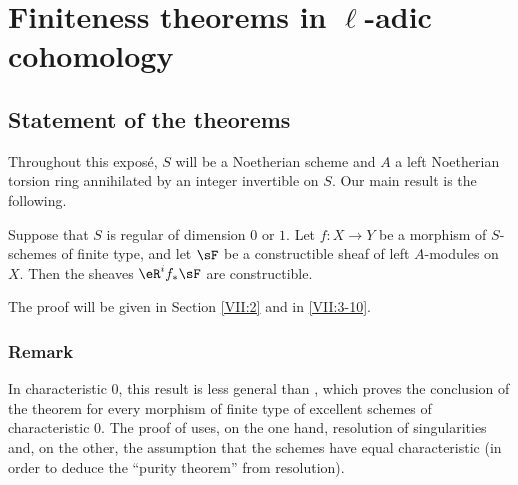 


\chapter{Finiteness theorems in \texorpdfstring{$\ell$}{l}-adic cohomology}\label{VII}











\section{Statement of the theorems}\label{VII:1}

Throughout this exposé, $S$ will be a Noetherian scheme and $A$ a left
Noetherian torsion ring annihilated by an integer invertible on $S$. Our main
result is the following.






\begin{theorem_}\label{VII:1-1}
Suppose that $S$ is regular of dimension $0$ or $1$. Let $f:X\to Y$ be a
morphism of $S$-schemes of finite type, and let $\sF$ be a constructible sheaf
of left $A$-modules on $X$. Then the sheaves $\eR^i f_\ast \sF$ are
constructible.
\end{theorem_}

The proof will be given in Section \ref{VII:2} and in \ref{VII:3-10}.






\subsection{Remark}\label{VII:1-2}

In characteristic $0$, this result is less general than
, which proves the conclusion of the theorem for
every morphism of finite type of excellent schemes of characteristic $0$.
The proof of  uses, on the one hand, resolution of
singularities and, on the other, the assumption that the schemes have equal
characteristic (in order to deduce the ``purity theorem'' from resolution).







